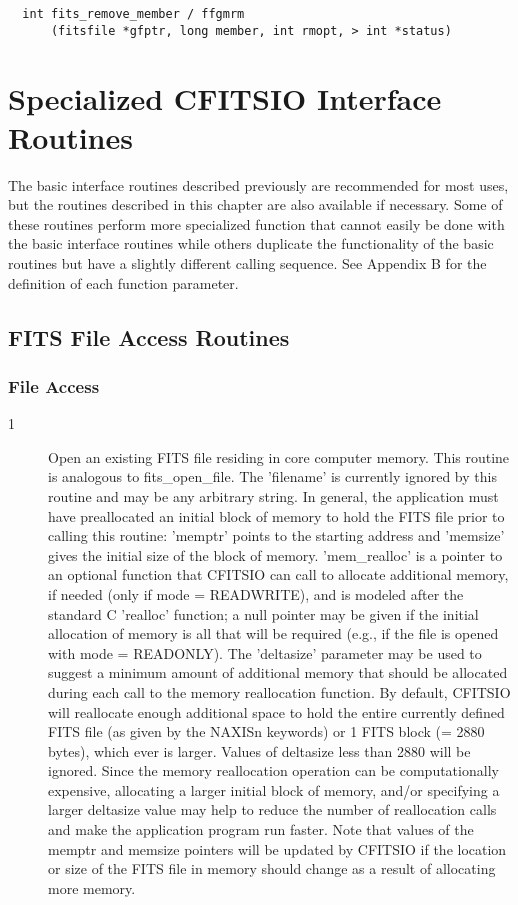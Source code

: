 \documentclass[11pt]{book}
\begin{document}
\begin{verbatim}
  int fits_remove_member / ffgmrm
      (fitsfile *gfptr, long member, int rmopt, > int *status)
\end{verbatim}

\chapter{ Specialized CFITSIO Interface Routines }

The basic interface routines described previously are recommended
for most uses, but the routines described in this chapter
are also available if necessary.  Some of these routines perform more
specialized function that cannot easily be done with the basic
interface routines while others duplicate the functionality of the
basic routines but have a slightly different calling sequence.
See Appendix B for the definition of each function parameter.


\section{FITS File Access Routines}

\subsection{File Access}

\begin{description}
\item[1 ] Open an existing FITS file residing in core computer memory.  This
routine is analogous to fits\_open\_file.   The 'filename'  is
currently ignored by this routine and may be any arbitrary string. In
general, the application must have preallocated an initial block of
memory to hold the FITS file prior to calling this routine:  'memptr'
points to the starting address and 'memsize' gives the initial size of
the block of memory.  'mem\_realloc' is a pointer to an optional
function that CFITSIO can call to allocate additional memory, if needed
(only if mode = READWRITE), and is modeled after the standard C
'realloc' function;  a null pointer may be given if the initial
allocation of memory is all that will be required (e.g., if the file is
opened with mode = READONLY).  The 'deltasize' parameter may be used to
suggest a minimum amount of additional memory that should be allocated
during each call to the memory reallocation function.  By default,
CFITSIO will reallocate enough additional space to hold the entire
currently defined FITS file (as given by the NAXISn keywords) or 1 FITS
block (= 2880 bytes), which ever is larger.  Values of deltasize less
than 2880 will be ignored.  Since the memory reallocation operation can
be computationally expensive, allocating a larger initial block of
memory, and/or specifying a larger deltasize value may help to reduce
the number of reallocation calls and make the application program run
faster.  Note that values of the memptr and memsize pointers will be updated
by CFITSIO if the location or size of the FITS file in memory
should change as a result of allocating more memory. \label{ffomem}
\end{description}
\end{document}
